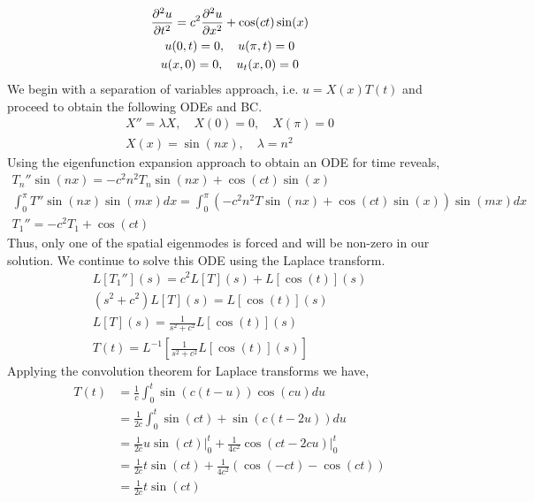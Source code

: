 \documentclass{article}
\begin{document}
\begin{gather*}
    \frac{\partial^2 u}{\partial t^2} = c^2\frac{\partial^2 u}{\partial x^2} + \cos(ct)\sin(x)\\
    u(0,t) = 0, \quad u(\pi, t) = 0\\
    u(x,0) = 0, \quad u_t(x,0) = 0
\end{gather*}
We begin with a separation of variables approach, i.e. $u = X(x)T(t)$ and
proceed to obtain the following ODEs and BC. 
\begin{gather}
    X'' = \lambda X, \quad X(0) = 0, \quad X(\pi) = 0\\
    X(x) = \sin(nx),\quad \lambda = n^2
\end{gather}
Using the eigenfunction expansion approach to obtain an ODE for time reveals, 
\begin{gather}
    T_n''\sin(nx) = -c^2n^2T_n\sin(nx)+ \cos(ct)\sin(x)\\
    \int_0^{\pi}T''\sin(nx)\sin(mx)dx = \int_0^{\pi}\left(-c^2n^2T\sin(nx)+
    \cos(ct)\sin(x)\right)\sin(mx)dx \\
    T_1'' = -c^2T_1 + \cos(ct)
\end{gather}
Thus, only one of the spatial eigenmodes is forced and will be non-zero in our
solution. We continue to solve this ODE using the Laplace transform. 
\begin{gather}
    L[T_1''](s) = c^2L[T](s) + L[\cos(t)](s)\\
    (s^2+c^2)L[T](s) = L[\cos(t)](s)\\
    L[T](s) = \frac{1}{s^2+c^2}L[\cos(t)](s)\\
    T(t) = L^{-1}\left[\frac{1}{s^2+c^2}L[\cos(t)](s)\right]
\end{gather}
Applying the convolution theorem for Laplace transforms we have, 
\begin{align}
    T(t) &= \frac{1}{c}\int_0^t\sin(c(t-u))\cos(cu)du \\
    &= \frac{1}{2c}\int_0^t\sin(ct) + \sin(c(t-2u))du \\
    &= \frac{1}{2c}u\sin(ct)\Big|_0^t + \frac{1}{4c^2}\cos(ct -
    2cu)\Big|_0^{t}\\
    &= \frac{1}{2c}t\sin(ct) + \frac{1}{4c^2}\left(\cos(-ct) - \cos(ct)\right)\\
    &= \frac{1}{2c}t\sin(ct)
\end{align}
\end{document}
